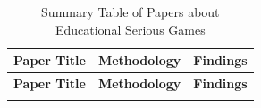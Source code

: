 
\begin{longtable}{|p{}|p{}|p{}|}
\hline
\textbf{Paper Title} & \textbf{Methodology} & \textbf{Findings} \\
\hline
\endfirsthead

\hline
\textbf{Paper Title} & \textbf{Methodology} & \textbf{Findings} \\
\hline
\endhead

\hline
\endfoot


\caption{Summary Table of Papers about Educational Serious Games}
\label{tab:serious_games}
\end{longtable}
